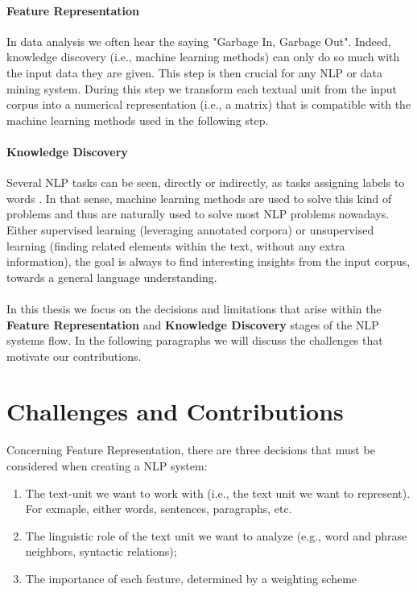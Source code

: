 \paragraph {Feature Representation} In data analysis we often hear the saying "Garbage In, Garbage Out". Indeed, knowledge discovery (i.e., machine learning methods)  can only do so much with the input data they are given.  This step is then crucial for any NLP or data mining system.   During this step we transform each textual unit from the input corpus into a numerical representation (i.e., a matrix) that is compatible with the machine learning methods used in the following step.

\paragraph {Knowledge Discovery} Several NLP tasks can be seen, directly or indirectly, as tasks assigning labels to words \cite{Collobert2011}. In that sense, machine learning methods are used to solve this kind of problems and thus are naturally used to solve most NLP problems nowadays. Either supervised learning (leveraging annotated corpora) or unsupervised learning (finding related elements within the text, without any extra information), the goal is always to find interesting insights from the input corpus, towards a general language understanding. 
\\ \\
In this thesis we focus on the decisions and limitations that arise within the \textbf{Feature Representation} and \textbf{Knowledge Discovery} stages of the NLP systems flow. In the following paragraphs we will discuss   the challenges that motivate our contributions.

\section{Challenges and Contributions}
Concerning Feature Representation, there are three decisions that must be considered when creating a NLP system: 
\begin{enumerate}
\item The text-unit we want to work with (i.e., the text unit we want to represent). For exmaple, either words, sentences, paragraphs, etc.
\item The linguistic role of the text unit we want to analyze (e.g., word and phrase neighbors, syntactic relations);
\item The importance of each feature,  determined by a weighting scheme

\end{enumerate}

